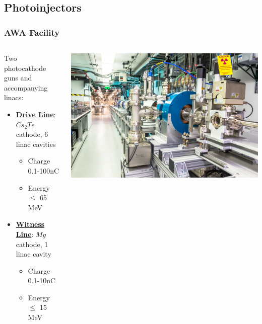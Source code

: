 \documentclass[professionalfonts,t]{beamer}
\begin{document}
\subsection{Photoinjectors}
\begin{frame}[t]
\frametitle{AWA Facility}
\vspace{1em}
\begin{columns}[T] %
	\begin{column}{.48\textwidth}
					Two photocathode guns and accompanying linacs:
			\begin{itemize}
				\item{\underline{\textbf{Drive Line}}: $Cs_2Te$ cathode, 6 linac cavities}
				\begin{itemize}
					\item{Charge 0.1-100nC}
					\item{Energy $\leq$ 65 MeV}
					
				\end{itemize}
				\item{\underline{\textbf{Witness Line}}: $Mg$ cathode, 1 linac cavity}
				\begin{itemize}
					\item{Charge 0.1-10nC}
					\item{Energy $\leq$ 15 MeV}
				\end{itemize}
			\end{itemize}
	\end{column}%
	\hfill%
	\begin{column}{.5\textwidth}
		\vspace{1em}
		\includegraphics[width=1.0\linewidth, right]{../images/drive_gun}
	\end{column}%
\end{columns}
\end{frame}
\end{document}
